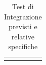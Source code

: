 \begin{footnotesize}
\begin{longtable}{|p{5.2cm}|p{10.8cm}|}
\hline
\caption{Test di Integrazione previsti e relative specifiche}
\end{longtable}
\end{footnotesize}




